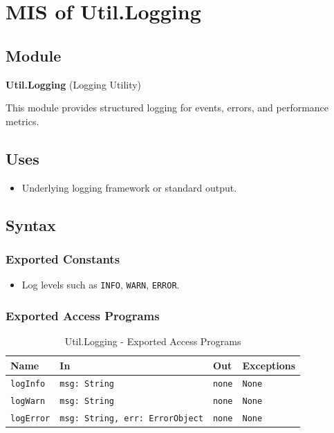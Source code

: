 \documentclass[12pt, titlepage]{article}
\begin{document}
\section{MIS of Util.Logging} \label{Util.Logging}

\subsection{Module}
\textbf{Util.Logging} \; (Logging Utility)

This module provides structured logging for events, errors, and performance metrics.

\subsection{Uses}
\begin{itemize}
    \item Underlying logging framework or standard output.
\end{itemize}

\subsection{Syntax}

\subsubsection{Exported Constants}
\begin{itemize}
    \item Log levels such as \texttt{INFO}, \texttt{WARN}, \texttt{ERROR}.
\end{itemize}

\subsubsection{Exported Access Programs}

\begin{table}[H]
\centering
\small
\caption{Util.Logging - Exported Access Programs}
\begin{tabular}{p{3.5cm} p{3.5cm} p{3.5cm} p{3.5cm}}
\toprule
\textbf{Name} & \textbf{In} & \textbf{Out} & \textbf{Exceptions} \\
\midrule
\texttt{logInfo} & \texttt{msg: String} & \texttt{none} & \texttt{None} \\
\texttt{logWarn} & \texttt{msg: String} & \texttt{none} & \texttt{None} \\
\texttt{logError} & \texttt{msg: String, err: ErrorObject} & \texttt{none} & \texttt{None} \\
\bottomrule
\end{tabular}
\end{table}
\end{document}
